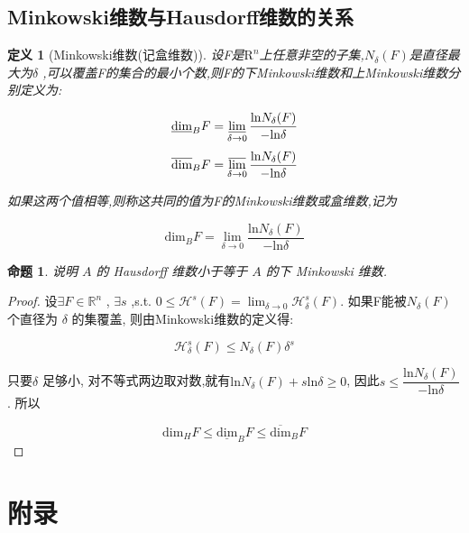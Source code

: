 \documentclass[hyperref,a4paper,UTF8]{ctexart}
\newtheorem{definition}{定义}[section]
\newtheorem{proposition}{{命题}}
\begin{document}
\subsection{Minkowski维数与Hausdorff维数的关系}

\begin{definition}[Minkowski维数(记盒维数)]
  设F是$\mathrm{R}^n$上任意非空的子集,$ N_{\delta}(F)$是直径最大为$\delta$ ,可以覆盖F的集合的最小个数,则F的下Minkowski维数和上Minkowski维数分别定义为:

  \[\underline{\mathrm{dim}}_B F = \varliminf\limits_{\delta \rightarrow 0} \frac{\mathrm{ln}N_{\delta}(F)}{-\mathrm{ln}\delta} \]
  \[\overline{\mathrm{dim}}_B F = \varlimsup\limits_{\delta \rightarrow 0} \frac{\mathrm{ln}N_{\delta}(F)}{-\mathrm{ln}\delta} \]

  如果这两个值相等,则称这共同的值为F的Minkowski维数或盒维数,记为

  \[{\mathrm{dim}}_B F = \lim\limits_{\delta \rightarrow 0} \frac{\mathrm{ln}N_{\delta}(F)}{-\mathrm{ln}\delta} \]
\end{definition}

\begin{proposition}

  说明 $A$ 的 Hausdorff 维数小于等于 $A$ 的下 Minkowski 维数.
\end{proposition}

\begin{proof}
  设$\exists F \in \mathbb{R}^n$  , $\exists s$ ,s.t. $0 \le \mathcal{H}^{s}(F) = \lim_{\delta \rightarrow 0}\mathcal{H}^{s}_{\delta}(F)$. 如果F能被$N_{\delta}(F)$个直径为 $\delta$ 的集覆盖, 则由Minkowski维数的定义得:
  
  \[ \mathcal{H}^{s}_\delta(F) \leqslant N_{\delta}(F){\delta}^{s} \]

  只要$\delta$ 足够小, 对不等式两边取对数,就有$ \mathrm{ln } N_{\delta}(F) + s \mathrm{ln } \delta \ge 0$, 因此$s \leqslant \dfrac{\mathrm{ln} N_{\delta}(F)}{ - \mathrm{ln} \delta}$. 所以 

  \[
  \mathrm{\mathrm{dim}}_H F \leqslant \underline{\mathrm{dim}}_B F \leqslant \overline{\mathrm{dim}}_B F
  \]


\end{proof}

\appendix
\section*{附录}
\end{document}
